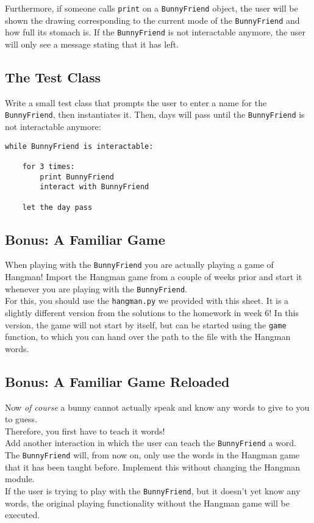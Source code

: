 \noindent Furthermore, if someone calls \texttt{print} on a \texttt{BunnyFriend} object, the user will be shown
the drawing corresponding to the current mode of the \texttt{BunnyFriend} and how full its stomach is.
If the \texttt{BunnyFriend} is not interactable anymore, the user will only see a message stating that it
has left.

\subsection{The Test Class}
Write a small test class that prompts the user to enter a name for the \texttt{BunnyFriend}, then instantiates it.
Then, days will pass until the \texttt{BunnyFriend} is not interactable anymore:

\begin{verbatim}
while BunnyFriend is interactable:

    for 3 times:
        print BunnyFriend
        interact with BunnyFriend

    let the day pass
\end{verbatim}

\subsection{Bonus: A Familiar Game}
When playing with the \texttt{BunnyFriend} you are actually playing a game of Hangman!
Import the Hangman game from a couple of weeks prior and start it whenever you are playing with the \texttt{BunnyFriend}.\\
For this, you should use the \texttt{hangman.py} we provided with this sheet. It is a slightly different version from the
solutions to the homework in week 6! In this version, the game will not start by itself, but can be started using the \texttt{game}
function, to which you can hand over the path to the file with the Hangman words.

\subsection{Bonus: A Familiar Game Reloaded}
Now \textit{of course} a bunny cannot actually speak and know any words to give to you to guess.\\
Therefore, you first have to teach it words!\\
Add another interaction in which the user can teach the \texttt{BunnyFriend} a word. The \texttt{BunnyFriend} will, from now on,
only use the words in the Hangman game that it has been taught before. Implement this without changing the Hangman module.\\
If the user is trying to play with the \texttt{BunnyFriend}, but it doesn't yet know any words, the original playing functionality
without the Hangman game will be executed.



